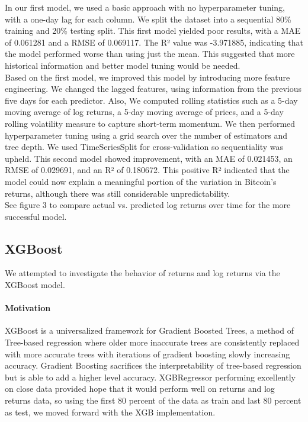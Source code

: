 \documentclass{article}
\begin{document}
In our first model, we used a basic approach with no hyperparameter tuning, with a one-day lag for each column. We split the dataset into a sequential 80\% training and 20\% testing split. This first model yielded poor results, with a MAE of 0.061281 and a RMSE of 0.069117. The R² value was -3.971885, indicating that the model performed worse than using just the mean. This suggested that more historical information and better model tuning would be needed.\\ 

Based on the first model, we improved this model by introducing more feature engineering. We changed the lagged features, using information from the previous five days for each predictor. Also, We computed rolling statistics such as a 5-day moving average of log returns, a 5-day moving average of prices, and a 5-day rolling volatility measure to capture short-term momentum. We then performed hyperparameter tuning using a grid search over the number of estimators and tree depth. We used TimeSeriesSplit for cross-validation so sequentiality was upheld. This second model showed improvement, with an MAE of 0.021453, an RMSE of 0.029691, and an R² of 0.180672. This positive R² indicated that the model could now explain a meaningful portion of the variation in Bitcoin’s returns, although there was still considerable unpredictability. \\

See figure 3 to compare actual vs. predicted log returns over time for the more successful model.

\subsection{XGBoost}
We attempted to investigate the behavior of returns and log returns via the XGBoost model.

\paragraph{Motivation}
XGBoost is a universalized framework for Gradient Boosted Trees, a method of Tree-based regression where older more inaccurate trees are consistently replaced with more accurate trees with iterations of gradient boosting slowly increasing accuracy. Gradient Boosting sacrifices the interpretability of tree-based regression but is able to add a higher level accuracy. XGBRegressor performing excellently on close data provided hope that it would perform well on returns and log returns data, so using the first 80 percent of the data as train and last 80 percent as test, we moved forward with the XGB implementation.
\end{document}
